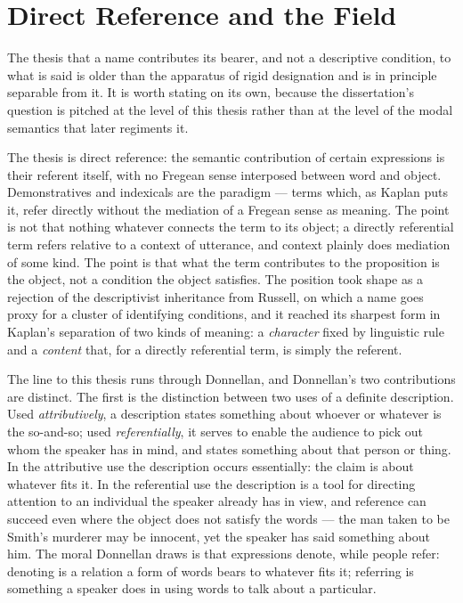 \documentclass[12pt,a4paper]{article}
\begin{document}
\section{Direct Reference and the Field}\label{direct-reference-and-the-field}

The thesis that a name contributes its bearer, and not a descriptive condition, to what is said is older than the apparatus of rigid designation and is in principle separable from it. It is worth stating on its own, because the dissertation's question is pitched at the level of this thesis rather than at the level of the modal semantics that later regiments it.

The thesis is direct reference: the semantic contribution of certain expressions is their referent itself, with no Fregean sense interposed between word and object. Demonstratives and indexicals are the paradigm --- terms which, as Kaplan puts it, refer directly without the mediation of a Fregean sense as meaning. The point is not that nothing whatever connects the term to its object; a directly referential term refers relative to a context of utterance, and context plainly does mediation of some kind. The point is that what the term contributes to the proposition is the object, not a condition the object satisfies. The position took shape as a rejection of the descriptivist inheritance from Russell, on which a name goes proxy for a cluster of identifying conditions, and it reached its sharpest form in Kaplan's separation of two kinds of meaning: a \emph{character} fixed by linguistic rule and a \emph{content} that, for a directly referential term, is simply the referent.

The line to this thesis runs through Donnellan, and Donnellan's two contributions are distinct. The first is the distinction between two uses of a definite description. Used \emph{attributively}, a description states something about whoever or whatever is the so-and-so; used \emph{referentially}, it serves to enable the audience to pick out whom the speaker has in mind, and states something about that person or thing. In the attributive use the description occurs essentially: the claim is about whatever fits it. In the referential use the description is a tool for directing attention to an individual the speaker already has in view, and reference can succeed even where the object does not satisfy the words --- the man taken to be Smith's murderer may be innocent, yet the speaker has said something about him. The moral Donnellan draws is that expressions denote, while people refer: denoting is a relation a form of words bears to whatever fits it; referring is something a speaker does in using words to talk about a particular.
\end{document}
